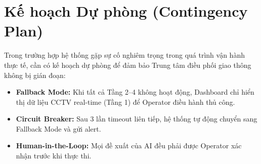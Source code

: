 \section{Kế hoạch Dự phòng (Contingency Plan)}

Trong trường hợp hệ thống gặp sự cố nghiêm trọng trong quá trình vận hành thực tế, cần có kế hoạch dự phòng để đảm bảo Trung tâm điều phối giao thông không bị gián đoạn:

\begin{itemize}[leftmargin=1.5cm, itemsep=4pt]
  \item \textbf{Fallback Mode:} Khi tất cả Tầng 2--4 không hoạt động, Dashboard chỉ hiển thị dữ liệu CCTV real-time (Tầng 1) để Operator điều hành thủ công.
  \item \textbf{Circuit Breaker:} Sau 3 lần timeout liên tiếp, hệ thống tự động chuyển sang Fallback Mode và gửi alert.
  \item \textbf{Human-in-the-Loop:} Mọi đề xuất của AI đều phải được Operator xác nhận trước khi thực thi.
\end{itemize}
